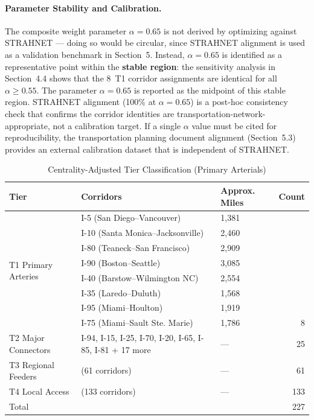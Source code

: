 \paragraph{Parameter Stability and Calibration.}
The composite weight parameter $\alpha = 0.65$ is not derived by optimizing against
STRAHNET --- doing so would be circular, since STRAHNET alignment is used as a validation
benchmark in Section~5. Instead, $\alpha = 0.65$ is identified as a representative point
within the \textbf{stable region}: the sensitivity analysis in Section~4.4 shows that the
8~T1 corridor assignments are identical for all $\alpha \geq 0.55$. The parameter $\alpha =
0.65$ is reported as the midpoint of this stable region. STRAHNET alignment (100\% at $\alpha
= 0.65$) is a post-hoc consistency check that confirms the corridor identities are
transportation-network-appropriate, not a calibration target. If a single $\alpha$ value
must be cited for reproducibility, the transportation planning document alignment (Section~5.3)
provides an external calibration dataset that is independent of STRAHNET.

\begin{table}[h!]
\centering
\caption{Centrality-Adjusted Tier Classification (Primary Arterials)}
\label{tab:tier-central}
\begin{tabular}{lllr}
\toprule
\textbf{Tier} & \textbf{Corridors} & \textbf{Approx. Miles} & \textbf{Count} \\
\midrule
\multirow{8}{*}{T1 Primary Arteries}
  & I-5 (San Diego--Vancouver) & 1,381 & \\
  & I-10 (Santa Monica--Jacksonville) & 2,460 & \\
  & I-80 (Teaneck--San Francisco) & 2,909 & \\
  & I-90 (Boston--Seattle) & 3,085 & \\
  & I-40 (Barstow--Wilmington NC) & 2,554 & \\
  & I-35 (Laredo--Duluth) & 1,568 & \\
  & I-95 (Miami--Houlton) & 1,919 & \\
  & I-75 (Miami--Sault Ste. Marie) & 1,786 & 8 \\
\midrule
T2 Major Connectors & I-94, I-15, I-25, I-70, I-20, I-65, I-85, I-81 + 17 more & --- & 25 \\
T3 Regional Feeders & (61 corridors) & --- & 61 \\
T4 Local Access     & (133 corridors) & --- & 133 \\
\midrule
Total & & & 227 \\
\bottomrule
\end{tabular}
\end{table}

